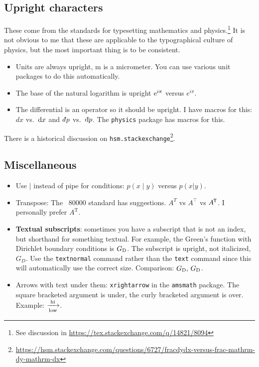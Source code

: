 \subsection{Upright characters}

These come from the  standards for typesetting mathematics and physics.\footnote{See discussion in \url{https://tex.stackexchange.com/q/14821/8094}} It is not obvious to me that these are applicable to the typographical culture of physics, but the most important thing is to be consistent.
\begin{itemize}
	\item Units are always upright, \textmu m is a micrometer. You can use various unit packages to do this automatically. 
	\item The base of the natural logarithm is upright $\e^{i\pi}$ versus $e^{i\pi}$.
	\item The differential is an operator so it should be upright. I have macros for this: $dx$ vs.~$\D{x}$ and $\dbar p$ vs.~$\Dbar{p}$. The \texttt{physics} package has macros for this. 
\end{itemize}
There is a historical discussion on \texttt{hsm.stackexchange}\footnote{\url{https://hsm.stackexchange.com/questions/6727/fracdydx-versus-frac-mathrm-dy-mathrm-dx}}.


\subsection{Miscellaneous}

\begin{itemize}
	\item Use $\mid$ instead of pipe for conditions: $p(x\mid y)$ versus $p(x|y)$.
	\item Transpose: The ~80000 standard has suggestions. $A^T$ vs $A^\top$ vs $A^{\trans}$. I personally prefer $A^\text{T}$.
	\item \textbf{Textual subscripts}: sometimes you have a subscript that is not an index, but shorthand for something textual. For example, the Green's function with Dirichlet boundary conditions is $G_\textnormal{D}$. The subscript is upright, not italicized, $G_D$. Use the \texttt{textnormal} command rather than the \texttt{text} command since this will automatically use the correct size. Comparison: $G_\textnormal{D},\, G_\text{D}$.
	\item Arrows with text under them: \texttt{xrightarrow} in the \texttt{amsmath} package. The square bracketed argument is under, the curly bracketed argument is over. Example: $\xrightarrow[\textnormal{low}]{\textnormal{hi}}$.
\end{itemize}



